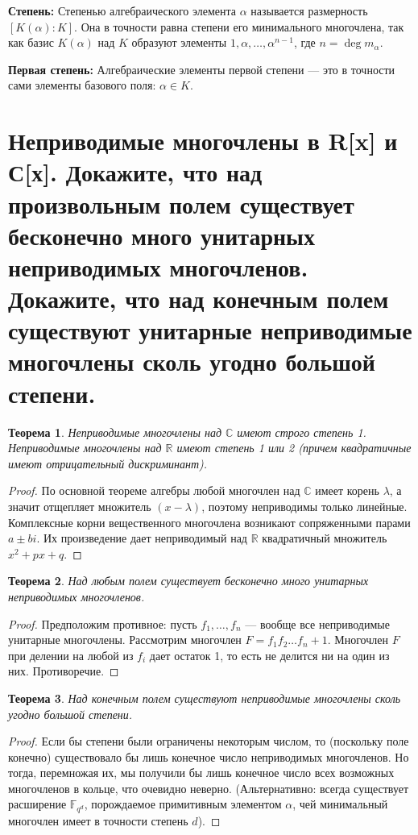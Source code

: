 \documentclass[12pt, a4paper]{article}
\theoremstyle{definition}
\theoremstyle{plain}
\newtheorem{theorem}{Теорема}[section]
\begin{document}
	\textbf{Степень:} Степенью алгебраического элемента $\alpha$ называется размерность $[K(\alpha):K]$. Она в точности равна степени его минимального многочлена, так как базис $K(\alpha)$ над $K$ образуют элементы $1, \alpha, \dots, \alpha^{n-1}$, где $n = \deg m_\alpha$.
	
	\textbf{Первая степень:} Алгебраические элементы первой степени — это в точности сами элементы базового поля: $\alpha \in K$.
	
	\newpage
	\section{Неприводимые многочлены в R[x] и С[х]. Докажите, что над произвольным полем существует бесконечно много унитарных неприводимых многочленов. Докажите, что над конечным полем существуют унитарные неприводимые многочлены сколь угодно большой степени.}
	
	\begin{theorem}
		Неприводимые многочлены над $\mathbb{C}$ имеют строго степень 1. Неприводимые многочлены над $\mathbb{R}$ имеют степень 1 или 2 (причем квадратичные имеют отрицательный дискриминант).
	\end{theorem}
	\begin{proof}
		По основной теореме алгебры любой многочлен над $\mathbb{C}$ имеет корень $\lambda$, а значит отщепляет множитель $(x-\lambda)$, поэтому неприводимы только линейные. Комплексные корни вещественного многочлена возникают сопряженными парами $a \pm bi$. Их произведение дает неприводимый над $\mathbb{R}$ квадратичный множитель $x^2+px+q$.
	\end{proof}
	
	\begin{theorem}
		Над любым полем существует бесконечно много унитарных неприводимых многочленов.
	\end{theorem}
	\begin{proof}
		Предположим противное: пусть $f_1, \dots, f_n$ — вообще все неприводимые унитарные многочлены. Рассмотрим многочлен $F = f_1 f_2 \dots f_n + 1$. Многочлен $F$ при делении на любой из $f_i$ дает остаток 1, то есть не делится ни на один из них. Противоречие.
	\end{proof}
	
	\begin{theorem}
		Над конечным полем существуют неприводимые многочлены сколь угодно большой степени.
	\end{theorem}
	\begin{proof}
		Если бы степени были ограничены некоторым числом, то (поскольку поле конечно) существовало бы лишь конечное число неприводимых многочленов. Но тогда, перемножая их, мы получили бы лишь конечное число всех возможных многочленов в кольце, что очевидно неверно. (Альтернативно: всегда существует расширение $\mathbb{F}_{q^d}$, порождаемое примитивным элементом $\alpha$, чей минимальный многочлен имеет в точности степень $d$).
	\end{proof}
	
\end{document}
